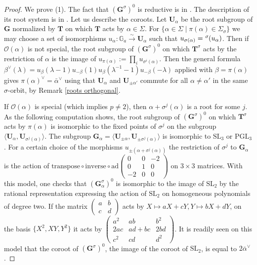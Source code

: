 \documentclass{amsart}
\numberwithin{equation}{section}
\theoremstyle{definition}
\theoremstyle{remark}
\newcommand\Ga{{\mathbb G_a}}
\newcommand\bG{{\mathbf G}}
\newcommand\bT{{\mathbf T}}
\newcommand\bU{{\mathbf U}}
\newcommand\CO{{\mathcal O}}
\newcommand\Gs{{\bG^\sigma}}
\newcommand\Gso{{(\Gs)^0}}
\newcommand\lexp[2]{\kern\scriptspace\vphantom{#2}^{#1}\kern-\scriptspace#2}
\newcommand\inv{^{-1}}
\newcommand\SL{\mathrm{SL}}
\newcommand\PGL{\mathrm{PGL}}
\newcommand\ad{\mathrm{ad}}
\newcommand\genby[1]{\mathopen\langle#1\mathclose\rangle}
\begin{document}
\begin{proof}
We prove (1).
The fact that $\Gso$ is reductive is in \cite[Proposition 1.8]{grnc}.
The description of its root system is in \cite[Proposition 2.1]{qss}. 
Let us describe the coroots.
Let $\bU_\alpha$ be the root subgroup of $\bG$ normalized by $\bT$ on
which $\bT$ acts by $\alpha\in\Sigma$.
For $\{\alpha\in\Sigma\mid \pi(\alpha)\in\Sigma_\sigma\}$
we may choose a set of isomorphisms $u_\alpha:\Ga\xrightarrow\sim \bU_\alpha$
such that $u_{\sigma(\alpha)}=\lexp\sigma(u_\alpha)$.
Then if $\CO(\alpha)$ is not special,  
the root subgroup of $\Gso$ on
which  $\bT^\sigma$ acts  by the  restriction of  $\alpha$ is  the image of
$u_{\pi(\alpha)}:=\prod_i u_{\sigma^i(\alpha)}$.
Then the general formula $\beta^\vee(\lambda)=
u_\beta(\lambda-1)u_{-\beta}(1)u_\beta(\lambda\inv-1)u_{-\beta}(-\lambda)$
applied with $\beta=\pi(\alpha)$ gives $\pi(\alpha)^\vee=\bar\alpha^\vee$
using that $\bU_\alpha$ and $\bU_{\pm\alpha'}$ commute for all
$\alpha\neq\alpha'$ in the same $\sigma$-orbit, by Remark \ref{roots orthogonal}.

If $\CO(\alpha)$ is special (which implies $p\ne 2$),
then $\alpha+\sigma^j(\alpha)$ is a root for
some  $j$.
As the following computation shows, the  root subgroup  of  $\Gso$
on  which  $\bT^\sigma$  acts by
$\pi(\alpha)$  is  isomorphic  to  the  fixed  points of $\sigma^j$ on the
subgroup $\genby{ \bU_\alpha, \bU_{\sigma^j(\alpha)}}$.
The subgroup $\bG_\alpha=
\genby{ \bU_{\pm \alpha},  \bU_{\pm\sigma^j(\alpha)}}$ is isomorphic to
$\SL_3$ or $\PGL_3$. For a certain choice of the morphisms
$u_{\pm(\alpha+\sigma^j(\alpha))}$   the  restriction  of  $\sigma^j$  to
$\bG_\alpha$  is the action of $\text{transpose}\circ\text{inverse}\circ\ad
\begin{pmatrix}0&0&-2\\   0&1&0\\   -2&0&0\end{pmatrix}$   on  $3\times  3$
matrices. With this model, one checks that $(\bG_\alpha^\sigma)^0$ is
isomorphic   to  the  image  of  $\SL_2$  by  the  rational  representation
expressing  the action of $\SL_2$ on homogeneous polynomials of degree two.
If  the  matrix  $\begin{pmatrix}a&b\\c&d\end{pmatrix}$  acts  by $X\mapsto
aX+cY,  Y\mapsto bX+dY$,  on the  basis $\{X^2,XY,Y^2\}$  it acts by
$\begin{pmatrix}a^2&ab&b^2\\2ac&ad+bc&2bd\\c^2&cd&d^2\end{pmatrix}$.  It is
readily  seen on this  model that the  coroot of $\Gso$,  the image of the
coroot of $\SL_2$, is equal to $2\bar\alpha^\vee$.


\end{proof}
\end{document}
